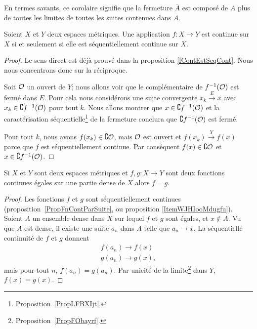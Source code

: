 En termes savants, ce corolaire signifie que la fermeture $\bar A$ est composé de $A$ plus de toutes les limites de toutes les suites contenues dans $A$.

\begin{proposition}     \label{PropXIAQSXr}
    Soient \( X\) et \( Y\) deux espaces métriques. Une application \( f\colon X\to Y\) est continue sur \( X\) si et seulement si elle est séquentiellement continue sur \( X\).
\end{proposition}

\begin{proof}
    Le sens direct est déjà prouvé dans la proposition \ref{fContEstSeqCont}. Nous nous concentrons donc sur la réciproque.

    Soit \( \mathcal{O}\) un ouvert de \( Y\); nous allons voir que le complémentaire de \( f^{-1}(\mathcal{O})\) est fermé dans \( E\). Pour cela nous considérons une suite convergente \( x_k\stackrel{E}{\longrightarrow} x\) avec \( x_k\in\complement f^{-1}(\mathcal{O})\) pour tout \( k\). Nous allons montrer que \( x\in \complement f^{-1}(\mathcal{O})\) et la caractérisation séquentielle\footnote{Proposition~\ref{PropLFBXIjt}.} de la fermeture conclura que \( \complement f^{-1}(\mathcal{O})\) est fermé.

    Pour tout \( k\), nous avons \( f(x_k)\in\complement \mathcal{O}\), mais \( \mathcal{O}\) est ouvert et \( f(x_k)\stackrel{Y}{\longrightarrow}f(x)\) parce que \( f\) est séquentiellement continue. Par conséquent \( f(x)\in\complement \mathcal{O}\) et \( x\in\complement f^{-1}(\mathcal{O})\).
\end{proof}


\begin{proposition} \label{PropCJGIooZNpnGF}
    Si \( X\) et \( Y\) sont deux espaces métriques et \( f,g\colon X\to Y\) sont deux fonctions continues égales sur une partie dense de \( X\) alors \( f=g\).
\end{proposition}

\begin{proof}
    Les fonctions \( f\) et \( g\) sont séquentiellement continues (proposition~\ref{PropFnContParSuite}, ou proposition \ref{ItemWJHIooMdugfu}). Soient \( A\) un ensemble dense dans \( X\) sur lequel \( f\) et \( g\) sont égales, et \( x\notin A\). Vu que \( A\) est dense, il existe une suite \( a_n\) dans \( A\) telle que \( a_n\to x\). La séquentielle continuité de \( f\) et \( g\) donnent
    \begin{subequations}
        \begin{align}
            f(a_n)\to f(x)\\
            g(a_n)\to g(x),
        \end{align}
    \end{subequations}
    mais pour tout \( n\), \( f(a_n)=g(a_n)\). Par unicité de la limite\footnote{Proposition~\ref{PropFObayrf}.} dans \( Y\), \( f(x)=g(x)\).
\end{proof}

